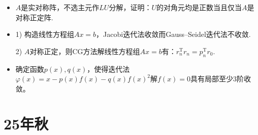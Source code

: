 \begin{itemize}
    \item[4.] $A$是实对称阵，不选主元作$LU$分解，证明：$U$的对角元均是正数当且仅当$A$是对称正定阵.

    \item[5.] 1) 构造线性方程组$Ax=b$，Jacobi迭代法收敛而Gauss--Seidel迭代法不收敛.

    2) $A$对称正定，则CG方法解线性方程组$Ax=b$有：$r_n^\mathrm{T}r_n=p_n^\mathrm{T} r_0$.

    \item[6.] 确定函数$p(x),q(x)$，使得迭代法$\varphi(x)=x-p(x)f(x)-q(x)f(x)^2$解$f(x)=0$具有局部至少$3$阶收敛。

\end{itemize}

\section{25年秋}

